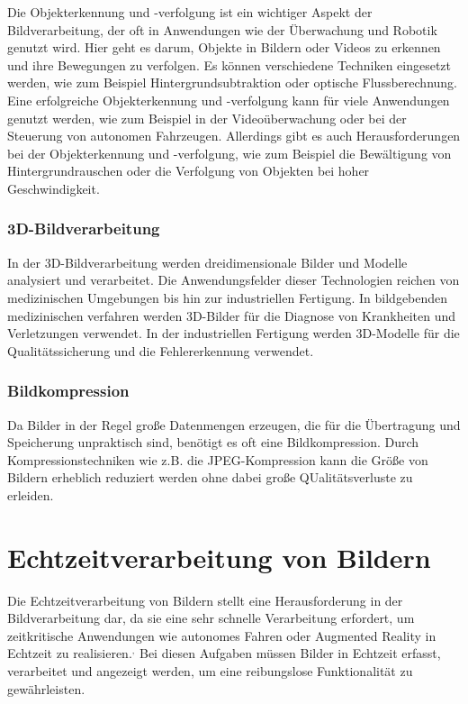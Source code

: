         Die Objekterkennung und -verfolgung ist ein wichtiger Aspekt der Bildverarbeitung, der oft in Anwendungen wie der Überwachung und Robotik genutzt wird. 
        Hier geht es darum, Objekte in Bildern oder Videos zu erkennen und ihre Bewegungen zu verfolgen. 
        Es können verschiedene Techniken eingesetzt werden, wie zum Beispiel Hintergrundsubtraktion oder optische Flussberechnung.
        Eine erfolgreiche Objekterkennung und -verfolgung kann für viele Anwendungen genutzt werden, wie zum Beispiel in der Videoüberwachung oder bei der Steuerung von autonomen Fahrzeugen. 
        Allerdings gibt es auch Herausforderungen bei der Objekterkennung und -verfolgung, wie zum Beispiel die Bewältigung von Hintergrundrauschen oder die Verfolgung von Objekten bei hoher Geschwindigkeit.
    
    \subsubsection{3D-Bildverarbeitung}
        In der 3D-Bildverarbeitung werden dreidimensionale Bilder und Modelle analysiert und verarbeitet.
        Die Anwendungsfelder dieser Technologien reichen von medizinischen Umgebungen bis hin zur industriellen Fertigung.
        In bildgebenden medizinischen verfahren werden 3D-Bilder für die Diagnose von Krankheiten und Verletzungen verwendet. 
        In der industriellen Fertigung werden 3D-Modelle für die Qualitätssicherung und die Fehlererkennung verwendet.
    
    \subsubsection{Bildkompression}
        Da Bilder in der Regel große Datenmengen erzeugen, die für die Übertragung und Speicherung unpraktisch sind, benötigt es oft eine Bildkompression. 
        Durch Kompressionstechniken wie z.B. die JPEG-Kompression kann die Größe von Bildern erheblich reduziert werden ohne dabei große QUalitätsverluste zu erleiden.
    
\section{Echtzeitverarbeitung von Bildern}

    Die Echtzeitverarbeitung von Bildern stellt eine Herausforderung in der Bildverarbeitung dar, da sie eine sehr schnelle Verarbeitung erfordert, um zeitkritische Anwendungen wie autonomes Fahren oder Augmented Reality in Echtzeit zu realisieren.$^{,}$
    Bei diesen Aufgaben müssen Bilder in Echtzeit erfasst, verarbeitet und angezeigt werden, um eine reibungslose Funktionalität zu gewährleisten.
    
